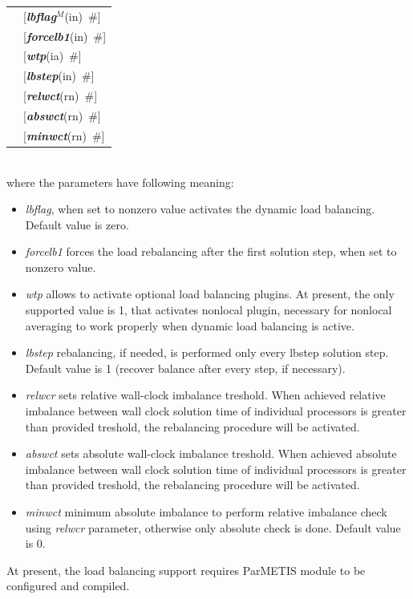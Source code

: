\documentclass[a4paper]{article}
\makeatletter
\newcommand{\param}[1]{{\em #1}}
\newcommand{\keywordnotype}[1]{\mbox{{\it{\bf{#1}}}}}
\newcommand{\keyword}[2]{\mbox{{\keywordnotype{#1}\tiny (#2)}}}
\newcommand{\field}[2]{\mbox{\keyword{#1}{#2}~\#}}
\newcommand{\optField}[2]{\mbox{[\field{#1}{#2}]}}
\newenvironment{record}[1][]{\begin{tabular}{|ll}}{\end{tabular}\\}
\newcommand{\recentry}[2]{{#1}&{#2}\\}
\newcounter{rcc}
\newenvironment{record}[1][\textwidth]{\setcounter{rcc}{0}\begin{tabular*}{#1}{|ll@{\extracolsep{\fill}}r}}{\end{tabular*}\\}
\newcommand{\recentry}[2]{\ifthenelse{\value{rcc}>0}{&$\backslash$ \\}{\setcounter{rcc}{1}}{#1}&{#2}}
\makeatother
\begin{document}
\noindent
\begin{record}
\recentry{\hspace{20mm}}{\optField{lbflag$^M$}{in}} \recentry{}{\optField{forcelb1}{in}}
\recentry{}{\optField{wtp}{ia}} \recentry{}{\optField{lbstep}{in}} \recentry{}{\optField{relwct}{rn}}
\recentry{}{\optField{abswct}{rn}} \recentry{}{\optField{minwct}{rn}}
\end{record}
where the parameters have following meaning:
\begin{itemize}
\item \param{lbflag}, when set to nonzero value activates the dynamic load balancing. Default value is zero.
\item \param{forcelb1} forces the load rebalancing after the first solution step, when set to nonzero value.
\item \param{wtp} allows to activate optional load balancing plugins. At present, the only supported value is 1, that activates nonlocal plugin, necessary for nonlocal averaging to work properly when dynamic load balancing is active.
\item \param{lbstep} rebalancing, if needed, is performed only every lbstep solution step.
Default value is 1 (recover balance after every step, if necessary).
\item \param{relwcr} sets relative wall-clock imbalance treshold. When achieved relative imbalance between wall clock solution time of individual processors is greater than provided treshold, the rebalancing procedure will be activated.
\item \param{abswct} sets absolute wall-clock imbalance treshold. When achieved absolute imbalance between wall clock solution time of individual processors is greater than provided treshold, the rebalancing procedure will be activated.
\item \param{minwct} minimum absolute imbalance to perform relative imbalance check using \param{relwcr} parameter,  otherwise only absolute check is done. Default value is 0.
\end{itemize}
At present, the load balancing support requires ParMETIS module to be configured and compiled.


%
\end{document}
